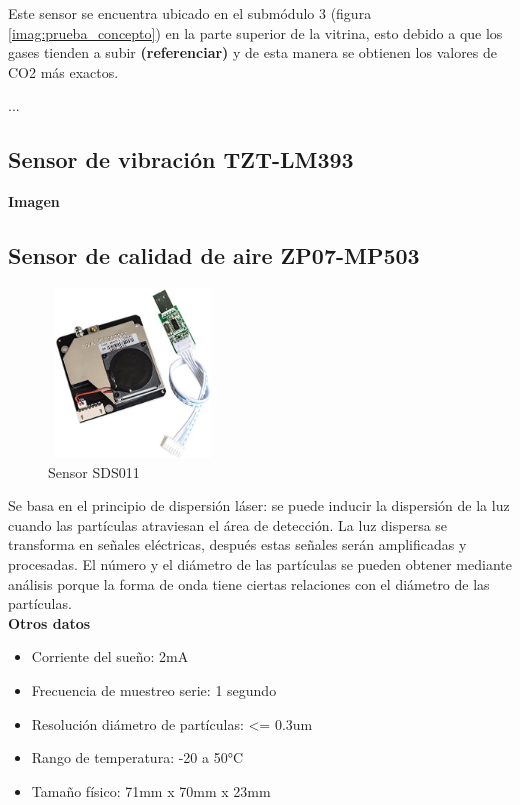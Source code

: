 Este sensor se encuentra ubicado en el submódulo 3 (figura \ref{imag:prueba_concepto}) en la parte superior de la vitrina, esto debido a que los gases tienden a subir \textbf{(referenciar)} y de esta manera se obtienen los valores de CO2 más exactos.

...

\subsection{Sensor de vibración TZT-LM393}

\textbf{Imagen}

\newpage

\subsection{Sensor de calidad de aire ZP07-MP503}

\vspace{1cm}

\begin{figure}[H]
      \centering
      \includegraphics[width=4.5cm, height=4.5cm]{imagenes/Sensor SDS011.jpg}
      \caption{Sensor SDS011}
      \label{imag:SDS011}
   \end{figure}

Se basa en el principio de dispersión láser: se puede inducir la dispersión de la luz cuando las partículas atraviesan el área de detección. La luz dispersa se transforma en señales eléctricas, después estas señales serán amplificadas y procesadas. El número y el diámetro de las partículas se pueden obtener mediante análisis porque la forma de onda tiene ciertas relaciones con el diámetro de las partículas.\\

\textbf{Otros datos}

\begin{itemize}
    \item Corriente del sueño: 2mA
    \item Frecuencia de muestreo serie: 1 segundo
    \item Resolución diámetro de partículas: <= 0.3um
    \item Rango de temperatura: -20 a 50°C
    \item Tamaño físico: 71mm x 70mm x 23mm 
\end{itemize}

